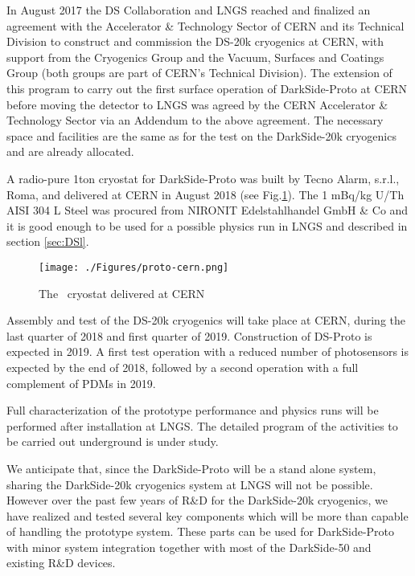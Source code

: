 In August 2017 the DS Collaboration and LNGS reached and finalized an agreement \cite{Mapelli:2017vn} with the Accelerator \& Technology Sector of CERN and its Technical Division to construct and commission the DS-20k cryogenics at CERN, with support from the Cryogenics Group and the Vacuum, Surfaces and Coatings Group (both groups are part of CERN's Technical Division). The extension of this program to carry out the first surface operation of DarkSide-Proto at CERN before moving the detector to LNGS was agreed by the CERN Accelerator \& Technology Sector via an Addendum to the above agreement. The necessary space and facilities are the same as for the test on the DarkSide-20k cryogenics and are already allocated.

A radio-pure 1ton cryostat for DarkSide-Proto was built by Tecno Alarm, s.r.l., Roma, and delivered at CERN in August 2018 (see Fig.\ref{fig:proto-cern}).
The 1 mBq/kg U/Th AISI 304 L Steel was procured from NIRONIT Edelstahlhandel GmbH \& Co and it is good enough to be used for a possible physics run in LNGS and described in section \ref{sec:DSl}.

\begin{figure}[h!]
\centering
\texttt{[image: ./Figures/proto-cern.png]}
\caption{The \DSp\ cryostat  delivered  at CERN}
\label{fig:proto-cern}
\end{figure}

Assembly and test of the DS-20k cryogenics will take place at CERN, during the last quarter of 2018 and first quarter of 2019. Construction of DS-Proto is expected in 2019. A first test operation with a reduced number of photosensors is expected by the end of 2018, followed by a second operation with a full complement of PDMs in 2019.

Full characterization of the prototype performance and physics runs will be performed after installation at LNGS. The detailed program of the activities to be carried out underground is under study.

We anticipate that, since the DarkSide-Proto will be a stand alone system, sharing the DarkSide-20k cryogenics system at LNGS will not be possible. However over the past few years of R\&D for the DarkSide-20k cryogenics, we have realized and tested several key components which will be more than capable of handling the prototype system. These parts can be used for DarkSide-Proto with minor system integration together with most of the DarkSide-50 and existing R\&D devices.

